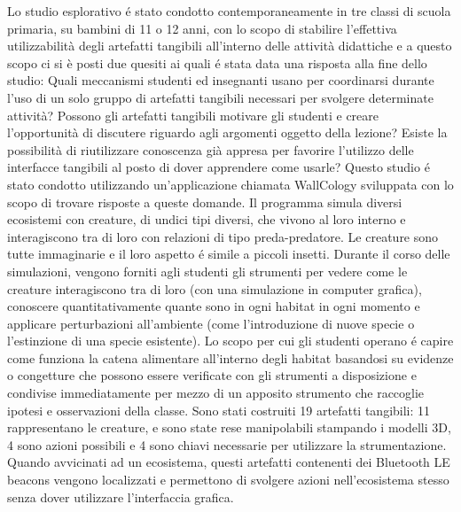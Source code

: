 Lo studio esplorativo é stato condotto contemporaneamente in tre classi di scuola primaria, su bambini di 11 o 12 anni, con lo scopo di stabilire l’effettiva utilizzabilità degli artefatti tangibili all’interno delle attività didattiche e a questo scopo ci si è posti due quesiti ai quali é stata data una risposta alla fine dello studio:
Quali meccanismi studenti ed insegnanti usano per coordinarsi durante l’uso di un solo gruppo di artefatti tangibili necessari per svolgere determinate attività?
Possono gli artefatti tangibili motivare gli studenti e creare l’opportunità di discutere riguardo agli argomenti oggetto della lezione? Esiste la possibilità di riutilizzare conoscenza già appresa per favorire l’utilizzo delle interfacce tangibili al posto di dover apprendere come usarle?
Questo studio é stato condotto utilizzando un’applicazione chiamata WallCology sviluppata con lo scopo di trovare risposte a queste domande. Il programma simula diversi ecosistemi con creature, di undici tipi diversi, che vivono al loro interno e interagiscono tra di loro con relazioni di tipo preda-predatore. Le creature sono tutte immaginarie e il loro aspetto é simile a piccoli insetti. Durante il corso delle simulazioni, vengono forniti agli studenti gli strumenti per vedere come le creature interagiscono tra di loro (con una simulazione in computer grafica), conoscere quantitativamente quante sono in ogni habitat in ogni momento e applicare perturbazioni all’ambiente (come l’introduzione di nuove specie o l’estinzione di una specie esistente). Lo scopo per cui gli studenti operano é capire come funziona la catena alimentare all’interno degli habitat basandosi su evidenze o congetture che possono essere verificate con gli strumenti a disposizione e condivise immediatamente per mezzo di un apposito strumento che raccoglie ipotesi e osservazioni della classe. Sono stati costruiti 19 artefatti tangibili: 11 rappresentano le creature, e sono state rese manipolabili stampando i modelli 3D, 4 sono azioni possibili e 4 sono chiavi necessarie per utilizzare la strumentazione. Quando avvicinati ad un ecosistema, questi artefatti contenenti dei Bluetooth LE beacons vengono localizzati e permettono di svolgere azioni nell’ecosistema stesso senza dover utilizzare l’interfaccia grafica.

